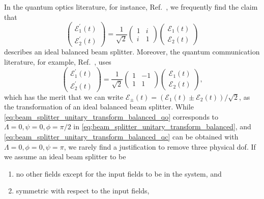 In the quantum optics literature, for instance, Ref.~\cite[p.~138]{Gerry2005}, we frequently find the claim that
\begin{equation}
    \begin{pmatrix}
        \mathcal{E}_1^\prime(t)
        \\
        \mathcal{E}_2^\prime(t)
    \end{pmatrix}
    =
    \frac{1}{\sqrt{2}}
    \begin{pmatrix}
        1 & i\\
        i & 1
    \end{pmatrix}
    \begin{pmatrix}
        \mathcal{E}_1(t)
        \\
        \mathcal{E}_2(t)
    \end{pmatrix}
    \label{eq:beam_splitter_unitary_transform_balanced_qo}
\end{equation}
describes an ideal balanced beam splitter.
Moreover, the quantum communication literature, for example, Ref.~\cite{Shapiro2009}, uses
\begin{equation}
    \begin{pmatrix}
        \mathcal{E}_1^\prime(t)
        \\
        \mathcal{E}_2^\prime(t)
    \end{pmatrix}
    =
    \frac{1}{\sqrt{2}}
    \begin{pmatrix}
        1 & -1\\
        1 & 1
    \end{pmatrix}
    \begin{pmatrix}
        \mathcal{E}_1(t)
        \\
        \mathcal{E}_2(t)
    \end{pmatrix}
    \label{eq:beam_splitter_unitary_transform_balanced_qc},
\end{equation}
which has the merit that we can write $\mathcal{E}_\pm(t)=\left(\mathcal{E}_1(t)\pm\mathcal{E}_2(t)\right)/\sqrt{2}$, as the transformation of an ideal balanced beam splitter.
While \cref{eq:beam_splitter_unitary_transform_balanced_qo} corresponds to $\Lambda=0,\psi=0,\phi=\pi/2$ in \cref{eq:beam_splitter_unitary_transform_balanced}, and \cref{eq:beam_splitter_unitary_transform_balanced_qc} can be obtained with $\Lambda=0,\phi=0,\psi=\pi$, we rarely find a justification to remove three physical \gls{dof}.
If we assume an ideal beam splitter to be
\begin{enumerate}
    \item no other fields except for the input fields to be in the system, and
    \item symmetric with respect to the input fields,
\end{enumerate}
